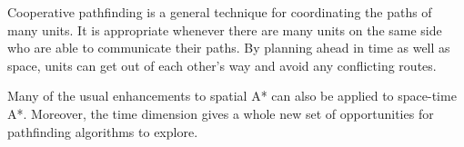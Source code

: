 Cooperative pathfinding is a general technique for coordinating the paths of many units.
It is appropriate whenever there are many units on the same side who are able to
communicate their paths. By planning ahead in time as well as space, units can get out of
each other’s way and avoid any conflicting routes.

Many of the usual enhancements to spatial A* can also be applied to space-time A*.
Moreover, the time dimension gives a whole new set of opportunities for pathfinding
algorithms to explore.
